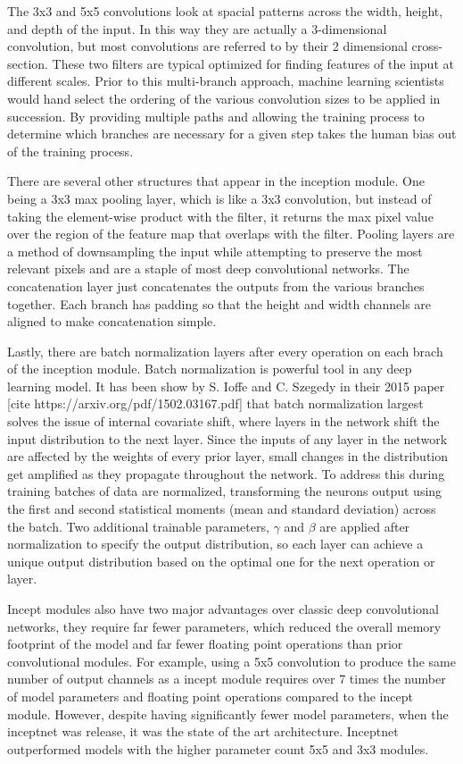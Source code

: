 The 3x3 and 5x5 convolutions look at spacial patterns across the width, height, and depth of the input.
In this way they are actually a 3-dimensional convolution, but most convolutions are referred to by their 2 dimensional cross-section.
These two filters are typical optimized for finding features of the input at different scales.
Prior to this multi-branch approach, machine learning scientists would hand select the ordering of the various convolution sizes to be applied in succession.
By providing multiple paths and allowing the training process to determine which branches are necessary for a given step takes the human bias out of the training process.

There are several other structures that appear in the inception module.
One being a 3x3 max pooling layer, which is like a 3x3 convolution, but instead of taking the element-wise product with the filter, it returns the max pixel value over the region of the feature map that overlaps with the filter.
Pooling layers are a method of downsampling the input while attempting to preserve the most relevant pixels and are a staple of most deep convolutional networks.
The concatenation layer just concatenates the outputs from the various branches together.
Each branch has padding so that the height and width channels are aligned to make concatenation simple.

Lastly, there are batch normalization layers after every operation on each brach of the inception module.
Batch normalization is powerful tool in any deep learning model.
It has been show by S. Ioffe and C. Szegedy in their 2015 paper [cite https://arxiv.org/pdf/1502.03167.pdf] that batch normalization largest solves the issue of internal covariate shift, where layers in the network shift the input distribution to the next layer.
Since the inputs of any layer in the network are affected by the weights of every prior layer, small changes in the distribution get amplified as they propagate throughout the network.
To address this during training batches of data are normalized, transforming the neurons output using the first and second statistical moments (mean and standard deviation) across the batch.
Two additional trainable parameters, $\gamma$ and $\beta$ are applied after normalization to specify the output distribution, so each layer can achieve a unique output distribution based on the optimal one for the next operation or layer.

Incept modules also have two major advantages over classic deep convolutional networks, they require far fewer parameters, which reduced the overall memory footprint of the model and far fewer floating point operations than prior convolutional modules.
For example, using a 5x5 convolution to produce the same number of output channels as a incept module requires over 7 times the number of model parameters and floating point operations compared to the incept module.
However, despite having significantly fewer model parameters, when the inceptnet was release, it was the state of the art architecture.
Inceptnet outperformed models with the higher parameter count 5x5 and 3x3 modules.

